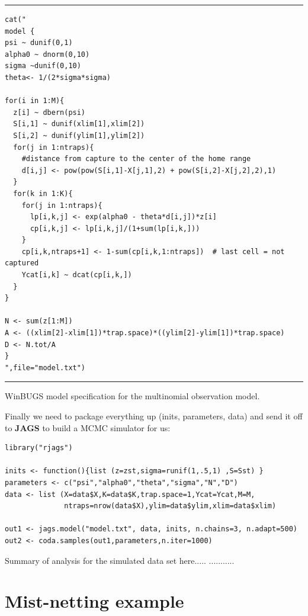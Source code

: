 \begin{panel}[htp]
\centering
\rule[0.15in]{\textwidth}{.03in}
{\small
\begin{verbatim}
cat("
model {
psi ~ dunif(0,1)
alpha0 ~ dnorm(0,10)
sigma ~dunif(0,10)
theta<- 1/(2*sigma*sigma)

for(i in 1:M){
  z[i] ~ dbern(psi)
  S[i,1] ~ dunif(xlim[1],xlim[2])
  S[i,2] ~ dunif(ylim[1],ylim[2])
  for(j in 1:ntraps){
    #distance from capture to the center of the home range
    d[i,j] <- pow(pow(S[i,1]-X[j,1],2) + pow(S[i,2]-X[j,2],2),1)
  }
  for(k in 1:K){
    for(j in 1:ntraps){
      lp[i,k,j] <- exp(alpha0 - theta*d[i,j])*z[i]            
      cp[i,k,j] <- lp[i,k,j]/(1+sum(lp[i,k,]))
    }
    cp[i,k,ntraps+1] <- 1-sum(cp[i,k,1:ntraps])  # last cell = not captured
    Ycat[i,k] ~ dcat(cp[i,k,])
  }  
}   

N <- sum(z[1:M]) 
A <- ((xlim[2]-xlim[1])*trap.space)*((ylim[2]-ylim[1])*trap.space)
D <- N.tot/A
}
",file="model.txt")

\end{verbatim}
}
\rule[-0.15in]{\textwidth}{.03in}
\caption{
WinBUGS model specification for the multinomial observation model. 
}
\label{poisson-mn.panel.mn}
\end{panel}

Finally we need to package everything up (inits, parameters, data) and send
it off to {\bf JAGS} to build a MCMC simulator for us:

{\small
\begin{verbatim}
library("rjags")

inits <- function(){list (z=zst,sigma=runif(1,.5,1) ,S=Sst) }              
parameters <- c("psi","alpha0","theta","sigma","N","D")
data <- list (X=data$X,K=data$K,trap.space=1,Ycat=Ycat,M=M,
              ntraps=nrow(data$X),ylim=data$ylim,xlim=data$xlim)         

out1 <- jags.model("model.txt", data, inits, n.chains=3, n.adapt=500)
out2 <- coda.samples(out1,parameters,n.iter=1000)
\end{verbatim}
}


Summary of analysis for the simulated data set here.....  ...........



\section{Mist-netting example}

